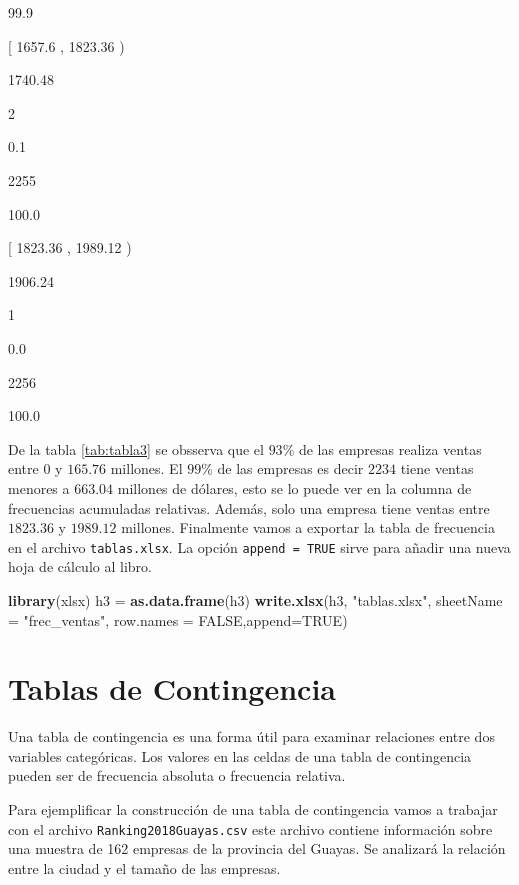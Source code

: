 \documentclass[]{book}
\newenvironment{Shaded}{\begin{snugshade}}{\end{snugshade}}
\newcommand{\KeywordTok}[1]{\textcolor[rgb]{0.13,0.29,0.53}{\textbf{#1}}}
\newcommand{\DataTypeTok}[1]{\textcolor[rgb]{0.13,0.29,0.53}{#1}}
\newcommand{\StringTok}[1]{\textcolor[rgb]{0.31,0.60,0.02}{#1}}
\newcommand{\OtherTok}[1]{\textcolor[rgb]{0.56,0.35,0.01}{#1}}
\newcommand{\NormalTok}[1]{#1}
\begin{document}
99.9

{[} 1657.6 , 1823.36 )

1740.48

2

0.1

2255

100.0

{[} 1823.36 , 1989.12 )

1906.24

1

0.0

2256

100.0

De la tabla \ref{tab:tabla3} se obsserva que el \(93\%\) de las empresas
realiza ventas entre 0 y \(165.76\) millones. El \(99\%\) de las
empresas es decir \(2234\) tiene ventas menores a \(663.04\) millones de
dólares, esto se lo puede ver en la columna de frecuencias acumuladas
relativas. Además, solo una empresa tiene ventas entre \(1823.36\) y
\(1989.12\) millones. Finalmente vamos a exportar la tabla de frecuencia
en el archivo \texttt{tablas.xlsx}. La opción \texttt{append\ =\ TRUE}
sirve para añadir una nueva hoja de cálculo al libro.

\begin{Shaded}
\begin{Highlighting}[]
\KeywordTok{library}\NormalTok{(xlsx)}
\NormalTok{h3 =}\StringTok{ }\KeywordTok{as.data.frame}\NormalTok{(h3)}
\KeywordTok{write.xlsx}\NormalTok{(h3, }\StringTok{"tablas.xlsx"}\NormalTok{, }\DataTypeTok{sheetName =} \StringTok{"frec_ventas"}\NormalTok{, }\DataTypeTok{row.names =} \OtherTok{FALSE}\NormalTok{,}\DataTypeTok{append=}\OtherTok{TRUE}\NormalTok{)}
\end{Highlighting}
\end{Shaded}

\section{Tablas de Contingencia}\label{tablas-de-contingencia}

Una tabla de contingencia es una forma útil para examinar relaciones
entre dos variables categóricas. Los valores en las celdas de una tabla
de contingencia pueden ser de frecuencia absoluta o frecuencia relativa.

Para ejemplificar la construcción de una tabla de contingencia vamos a
trabajar con el archivo \texttt{Ranking2018Guayas.csv} este archivo
contiene información sobre una muestra de 162 empresas de la provincia
del Guayas. Se analizará la relación entre la ciudad y el tamaño de las
empresas.
\end{document}
